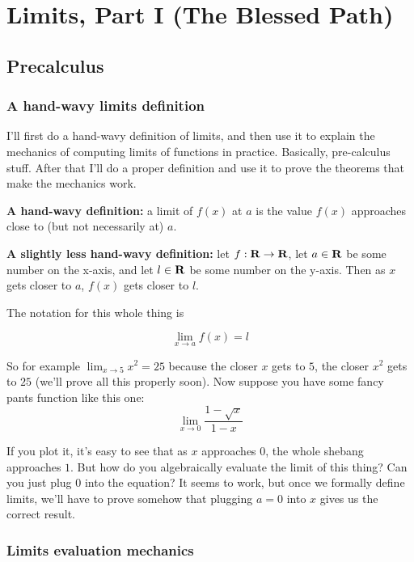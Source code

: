 \section{Limits, Part I (The Blessed Path)}

\subsection{Precalculus}
\subsubsection*{A hand-wavy limits definition}

I'll first do a hand-wavy definition of limits, and then use it to
explain the mechanics of computing limits of functions in practice.
Basically, pre-calculus stuff. After that I'll do a proper definition
and use it to prove the theorems that make the mechanics work.

\vs

\textbf{A hand-wavy definition:} a limit of $f(x)$ at $a$ is the value
$f(x)$ approaches close to (but not necessarily at) $a$.

\vs

\textbf{A slightly less hand-wavy definition:} let $f:\mathbf{R}\to\mathbf{R}$, let
$a\in\mathbf{R}$ be some number on the x-axis, and let $l\in\mathbf{R}$ be some number on
the y-axis. Then as $x$ gets closer to $a$, $f(x)$ gets closer to $l$.

\vs

The notation for this whole thing is

\[\lim_{x\to a} f(x)=l\]

So for example $\lim_{x\to5}x^2=25$ because the closer $x$ gets to
$5$, the closer $x^2$ gets to $25$ (we'll prove all this properly
soon). Now suppose you have some fancy pants function like this one:
\begin{equation}
\label{eq:1}
\lim_{x\to 0}\frac{1-\sqrt{x}}{1-x}
\end{equation}

If you plot it, it's easy to see that as $x$ approaches $0$, the whole
shebang approaches $1$. But how do you algebraically evaluate the
limit of this thing? Can you just plug $0$ into the equation? It seems
to work, but once we formally define limits, we'll have to prove
somehow that plugging $a=0$ into $x$ gives us the correct result.

\subsubsection*{Limits evaluation mechanics}

